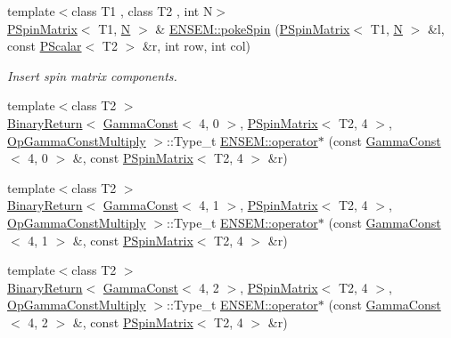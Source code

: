 \begin{DoxyCompactItemize}
\item 
{\footnotesize template$<$class T1 , class T2 , int N$>$ }\\\mbox{\hyperlink{classENSEM_1_1PSpinMatrix}{P\+Spin\+Matrix}}$<$ T1, \mbox{\hyperlink{operator__name__util_8cc_a7722c8ecbb62d99aee7ce68b1752f337}{N}} $>$ \& \mbox{\hyperlink{group__primspinmatrix_ga79a215ef6e9982decb24addd77e93dae}{E\+N\+S\+E\+M\+::poke\+Spin}} (\mbox{\hyperlink{classENSEM_1_1PSpinMatrix}{P\+Spin\+Matrix}}$<$ T1, \mbox{\hyperlink{operator__name__util_8cc_a7722c8ecbb62d99aee7ce68b1752f337}{N}} $>$ \&l, const \mbox{\hyperlink{classENSEM_1_1PScalar}{P\+Scalar}}$<$ T2 $>$ \&r, int row, int col)
\begin{DoxyCompactList}\small\item\em Insert spin matrix components. \end{DoxyCompactList}\item 
{\footnotesize template$<$class T2 $>$ }\\\mbox{\hyperlink{structENSEM_1_1BinaryReturn}{Binary\+Return}}$<$ \mbox{\hyperlink{classENSEM_1_1GammaConst}{Gamma\+Const}}$<$ 4, 0 $>$, \mbox{\hyperlink{classENSEM_1_1PSpinMatrix}{P\+Spin\+Matrix}}$<$ T2, 4 $>$, \mbox{\hyperlink{structENSEM_1_1OpGammaConstMultiply}{Op\+Gamma\+Const\+Multiply}} $>$\+::Type\+\_\+t \mbox{\hyperlink{group__primspinmatrix_ga3c278ae3c7e7dc6db3a144f463999af2}{E\+N\+S\+E\+M\+::operator$\ast$}} (const \mbox{\hyperlink{classENSEM_1_1GammaConst}{Gamma\+Const}}$<$ 4, 0 $>$ \&, const \mbox{\hyperlink{classENSEM_1_1PSpinMatrix}{P\+Spin\+Matrix}}$<$ T2, 4 $>$ \&r)
\item 
{\footnotesize template$<$class T2 $>$ }\\\mbox{\hyperlink{structENSEM_1_1BinaryReturn}{Binary\+Return}}$<$ \mbox{\hyperlink{classENSEM_1_1GammaConst}{Gamma\+Const}}$<$ 4, 1 $>$, \mbox{\hyperlink{classENSEM_1_1PSpinMatrix}{P\+Spin\+Matrix}}$<$ T2, 4 $>$, \mbox{\hyperlink{structENSEM_1_1OpGammaConstMultiply}{Op\+Gamma\+Const\+Multiply}} $>$\+::Type\+\_\+t \mbox{\hyperlink{group__primspinmatrix_gafa6af9df04bb90ce7675e5c8f4b13ac8}{E\+N\+S\+E\+M\+::operator$\ast$}} (const \mbox{\hyperlink{classENSEM_1_1GammaConst}{Gamma\+Const}}$<$ 4, 1 $>$ \&, const \mbox{\hyperlink{classENSEM_1_1PSpinMatrix}{P\+Spin\+Matrix}}$<$ T2, 4 $>$ \&r)
\item 
{\footnotesize template$<$class T2 $>$ }\\\mbox{\hyperlink{structENSEM_1_1BinaryReturn}{Binary\+Return}}$<$ \mbox{\hyperlink{classENSEM_1_1GammaConst}{Gamma\+Const}}$<$ 4, 2 $>$, \mbox{\hyperlink{classENSEM_1_1PSpinMatrix}{P\+Spin\+Matrix}}$<$ T2, 4 $>$, \mbox{\hyperlink{structENSEM_1_1OpGammaConstMultiply}{Op\+Gamma\+Const\+Multiply}} $>$\+::Type\+\_\+t \mbox{\hyperlink{group__primspinmatrix_ga55de5be902e508670e59d7c11c319618}{E\+N\+S\+E\+M\+::operator$\ast$}} (const \mbox{\hyperlink{classENSEM_1_1GammaConst}{Gamma\+Const}}$<$ 4, 2 $>$ \&, const \mbox{\hyperlink{classENSEM_1_1PSpinMatrix}{P\+Spin\+Matrix}}$<$ T2, 4 $>$ \&r)

\end{DoxyCompactItemize}
